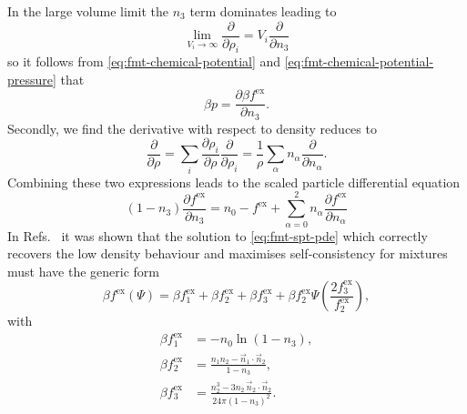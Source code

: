 In the large volume limit the $n_3$ term dominates leading to
\begin{equation*}
  \lim_{V_i \to \infty}
  \frac{\partial}{\partial \rho_i}
  =
  V_i \frac{\partial}{\partial n_3}
\end{equation*}
so it follows from \eqref{eq:fmt-chemical-potential} and \eqref{eq:fmt-chemical-potential-pressure} that
\begin{equation}\label{eq:fmt-pressure}
  \beta p
  =
  \frac{\partial \beta f^\mathrm{ex} }{\partial n_3}.
\end{equation}
Secondly, we find the derivative with respect to density reduces to
\begin{equation*}
  \frac{\partial}{\partial \rho}
  =
  \sum_i
  \frac{\partial \rho_i}{\partial \rho}
  \frac{\partial}{\partial \rho_i}
  =
  \frac{1}{\rho}
  \sum_\alpha
  n_\alpha
  \frac{\partial}{\partial n_\alpha}.
\end{equation*}
Combining these two expressions leads to the scaled particle%
differential equation \cite{RosenfeldPRL1989}
\begin{equation}\label{eq:fmt-spt-pde}
  (1 - n_3) \frac{\partial f^\mathrm{ex}}{\partial n_3}
  =
  n_0 - f^\mathrm{ex}
  + \sum_{\alpha = 0}^2
  n_\alpha \frac{\partial f^\mathrm{ex}}{\partial n_\alpha}
\end{equation}
In Refs.\ \cite{SantosJCP2012,SantosPRE2012} it was shown that the solution to \eqref{eq:fmt-spt-pde} which correctly recovers the low density behaviour and maximises self-consistency for mixtures must have the generic form
\begin{equation}\label{eq:santos-fmt}
  \beta f^\mathrm{ex}(\Psi)
  =
  \beta f^\mathrm{ex}_1 + \beta f^\mathrm{ex}_2 + \beta f^\mathrm{ex}_3
  + \beta f^\mathrm{ex}_2 \Psi\left(\frac{2 f^\mathrm{ex}_3}{f^\mathrm{ex}_2}\right),
\end{equation}
with
\begin{subequations}
  \begin{align}
    \beta f^\mathrm{ex}_1
    &=
    - n_0 \ln{(1 - n_3)},
    \\
    \beta f^\mathrm{ex}_2
    &=
    \frac{n_1 n_2 - \vec{n}_1 \cdot \vec{n}_2}{1 - n_3},
    \\
    \beta f^\mathrm{ex}_3
    &=
    \frac{n_2^3 - 3 n_2 \, \vec{n}_2 \cdot \vec{n}_2}{24 \pi (1 - n_3)^2}.
  \end{align}
\end{subequations}
